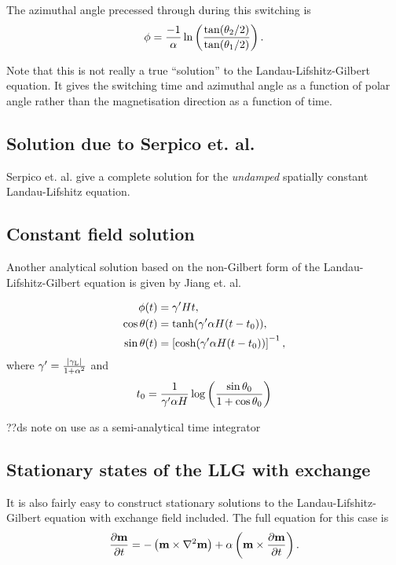 The azimuthal angle precessed through during this switching is
\begin{equation}
  \phi = \frac{-1}{\alpha} \ln \left( \frac{\tan(\theta_2/2)}{\tan(\theta_1/2)} \right).
\end{equation}

Note that this is not really a true ``solution'' to the Landau-Lifshitz-Gilbert equation.
It gives the switching time and azimuthal angle as a function of polar angle rather than the magnetisation direction as a function of time.

\subsection{Solution due to Serpico et. al.}

Serpico et. al. \cite{Serpico2003} give a complete solution for the \emph{undamped} spatially constant Landau-Lifshitz equation.




\subsection{Constant field solution}

Another analytical solution based on the non-Gilbert form of the Landau-Lifshitz-Gilbert equation is given by Jiang et. al.\cite{Jiang2001}

\begin{align*}
  \phi(t) &= \gamma' H t, \\
  \cos \theta(t) &= \tanh (\gamma' \alpha H (t - t_0)), \\
  \sin \theta(t) &= \left[ \cosh (\gamma' \alpha H (t - t_0)) \right]^{-1}, \\
\end{align*}
where $\gamma' = \frac{{|\gamma_{\text{\tiny{L}}}|}}{1 + \alpha^2}$ and
\begin{equation}
  t_0 = \frac{1}{\gamma' \alpha H} \log \left( \frac{\sin \theta_0}{1 + \cos \theta_0} \right)
\end{equation}


??ds note on use as a semi-analytical time integrator

\subsection{Stationary states of the LLG with exchange}

It is also fairly easy to construct stationary solutions to the Landau-Lifshitz-Gilbert equation with exchange field included.
The full equation for this case is
\begin{equation}
  \frac{\partial \mathbf{m}}{\partial t} = - \left( \mathbf{m} \times \nabla^2 \mathbf{m} \right) + \alpha \left( \mathbf{m} \times \frac{\partial \mathbf{m}}{\partial t} \right).
\end{equation}

